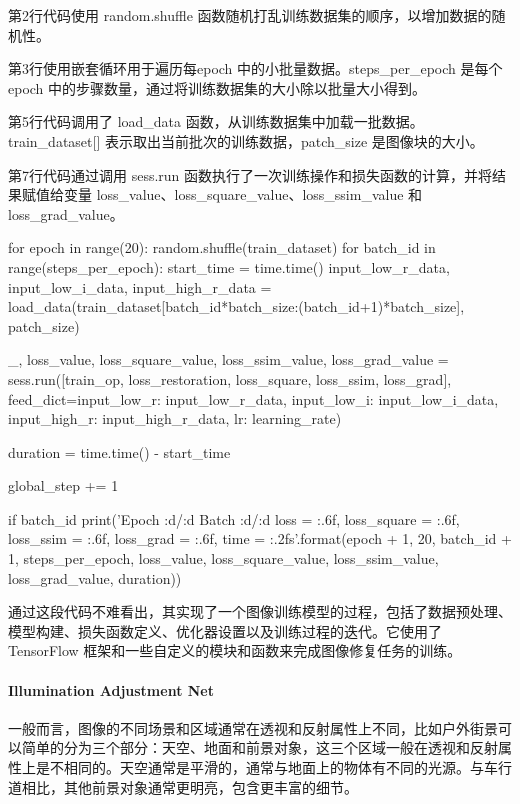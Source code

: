 \documentclass[letterpaper,12pt]{article}
\begin{document}
				第2行代码使用 random.shuffle 函数随机打乱训练数据集的顺序，以增加数据的随机性。
				
				第3行使用嵌套循环用于遍历每epoch 中的小批量数据。steps\_per\_epoch 是每个 epoch 中的步骤数量，通过将训练数据集的大小除以批量大小得到。
				
				第5行代码调用了 load\_data 函数，从训练数据集中加载一批数据。train\_dataset[] 表示取出当前批次的训练数据，patch\_size 是图像块的大小。

				第7行代码通过调用 sess.run 函数执行了一次训练操作和损失函数的计算，并将结果赋值给变量 loss\_value、loss\_square\_value、loss\_ssim\_value 和 loss\_grad\_value。
				
				\begin{python}
				for epoch in range(20):
					random.shuffle(train_dataset)
				for batch_id in range(steps_per_epoch):
					start_time = time.time()					
					input_low_r_data, input_low_i_data, input_high_r_data = load_data(train_dataset[batch_id*batch_size:(batch_id+1)*batch_size], patch_size)
					
					_, loss_value, loss_square_value, loss_ssim_value, loss_grad_value = sess.run([train_op, loss_restoration, loss_square, loss_ssim, loss_grad], feed_dict={input_low_r: input_low_r_data, input_low_i: input_low_i_data, input_high_r: input_high_r_data, lr: learning_rate})
					
					duration = time.time() - start_time
					
					global_step += 1
					
					if batch_id %
						print('Epoch {:d}/{:d} Batch {:d}/{:d} loss = {:.6f}, loss_square = {:.6f}, loss_ssim = {:.6f}, loss_grad = {:.6f}, time = {:.2f}s'.format(epoch + 1, 20, batch_id + 1, steps_per_epoch, loss_value, loss_square_value, loss_ssim_value, loss_grad_value, duration))
				\end{python}
				
				通过这段代码不难看出，其实现了一个图像训练模型的过程，包括了数据预处理、模型构建、损失函数定义、优化器设置以及训练过程的迭代。它使用了 TensorFlow 框架和一些自定义的模块和函数来完成图像修复任务的训练。
				
				
			\paragraph{Illumination Adjustment Net}
		
				一般而言，图像的不同场景和区域通常在透视和反射属性上不同，比如户外街景可以简单的分为三个部分：天空、地面和前景对象，这三个区域一般在透视和反射属性上是不相同的。天空通常是平滑的，通常与地面上的物体有不同的光源。与车行道相比，其他前景对象通常更明亮，包含更丰富的细节。
		
\end{document}

